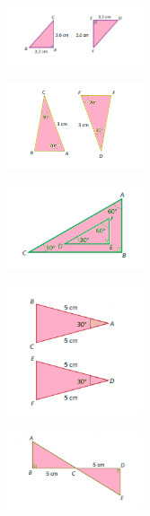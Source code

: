 \begin{multicols}{2}
\begin{escolha}
\item
\begin{figure}[H]
\centering\includegraphics[width=4cm]{./imgSAEB_8_MAT/media/image19.png}
\end{figure}  
\item
\begin{figure}[H]
\centering\includegraphics[width=4cm]{./imgSAEB_8_MAT/media/image20.png}
\end{figure}  
\item
\begin{figure}[H]
\centering\includegraphics[width=4cm]{./imgSAEB_8_MAT/media/image21.png}
\end{figure}  
\item
\begin{figure}[H]
\centering\includegraphics[width=4cm]{./imgSAEB_8_MAT/media/image22.png}
\end{figure}  
\item
\begin{figure}[H]
\centering\includegraphics[width=4cm]{./imgSAEB_8_MAT/media/image23.png}
\end{figure}  
\end{escolha}
\end{multicols}





